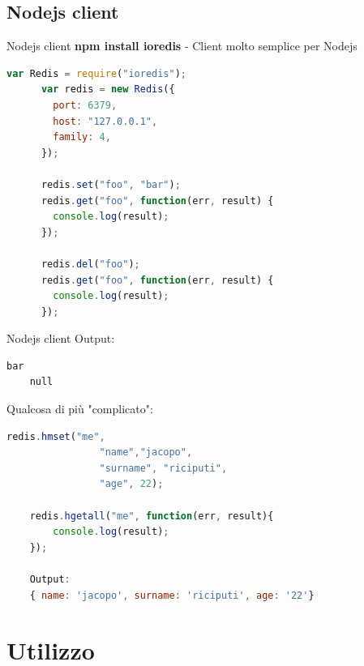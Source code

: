 \documentclass[xcolor=dvipsnames]{beamer}
\begin{document}
\subsection{Nodejs client}
\begin{frame}[fragile]{Nodejs client}
  \textbf{npm install ioredis} - Client molto semplice per Nodejs \\
  \begin{lstlisting}[language=JavaScript]
      var Redis = require("ioredis");
      var redis = new Redis({
        port: 6379,
        host: "127.0.0.1",
        family: 4,
      });

      redis.set("foo", "bar");
      redis.get("foo", function(err, result) {
        console.log(result);
      });

      redis.del("foo");
      redis.get("foo", function(err, result) {
        console.log(result);
      });
  \end{lstlisting}

\end{frame}

\begin{frame}[fragile]{Nodejs client}
  Output:
  \begin{lstlisting}[language=bash]
    bar
    null
  \end{lstlisting}

  Qualcosa di più "complicato":
  \begin{lstlisting}[language=JavaScript]
    redis.hmset("me",
                "name","jacopo",
                "surname", "riciputi",
                "age", 22);

    redis.hgetall("me", function(err, result){
        console.log(result);
    });

    Output:
    { name: 'jacopo', surname: 'riciputi', age: '22'}
  \end{lstlisting}
\end{frame}


\section{Utilizzo}
  \begin{frame}
    \begin{block}{\centering \huge \insertsectionhead}
    \end{block}
  \end{frame}
\end{document}
